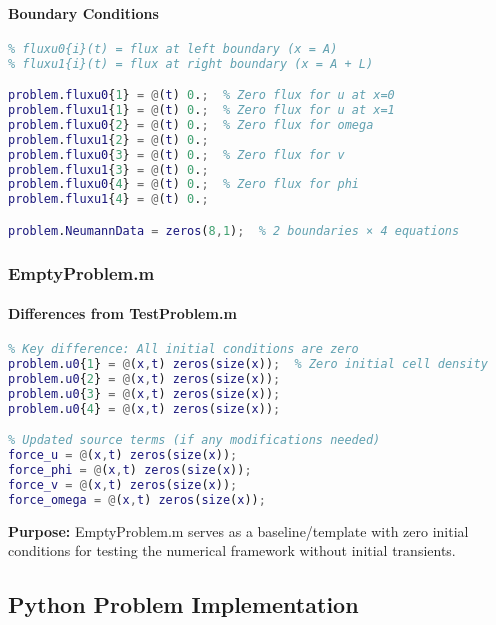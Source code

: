 \paragraph{Boundary Conditions}
\begin{lstlisting}[language=Matlab, caption=TestProblem.m Boundary Conditions]
% Neumann flux conditions at both boundaries
% fluxu0{i}(t) = flux at left boundary (x = A)
% fluxu1{i}(t) = flux at right boundary (x = A + L)

problem.fluxu0{1} = @(t) 0.;  % Zero flux for u at x=0
problem.fluxu1{1} = @(t) 0.;  % Zero flux for u at x=1
problem.fluxu0{2} = @(t) 0.;  % Zero flux for omega
problem.fluxu1{2} = @(t) 0.;
problem.fluxu0{3} = @(t) 0.;  % Zero flux for v
problem.fluxu1{3} = @(t) 0.;
problem.fluxu0{4} = @(t) 0.;  % Zero flux for phi
problem.fluxu1{4} = @(t) 0.;

problem.NeumannData = zeros(8,1);  % 2 boundaries × 4 equations
\end{lstlisting}

\subsubsection{EmptyProblem.m}

\paragraph{Differences from TestProblem.m}
\begin{lstlisting}[language=Matlab, caption=EmptyProblem.m Differences]
% Same parameter configuration as TestProblem.m
% Key difference: All initial conditions are zero
problem.u0{1} = @(x,t) zeros(size(x));  % Zero initial cell density
problem.u0{2} = @(x,t) zeros(size(x));
problem.u0{3} = @(x,t) zeros(size(x));
problem.u0{4} = @(x,t) zeros(size(x));

% Updated source terms (if any modifications needed)
force_u = @(x,t) zeros(size(x));
force_phi = @(x,t) zeros(size(x));
force_v = @(x,t) zeros(size(x));
force_omega = @(x,t) zeros(size(x));
\end{lstlisting}

\textbf{Purpose:} EmptyProblem.m serves as a baseline/template with zero initial conditions for testing the numerical framework without initial transients.

\subsection{Python Problem Implementation}
\label{subsec:python_problem_implementation}

